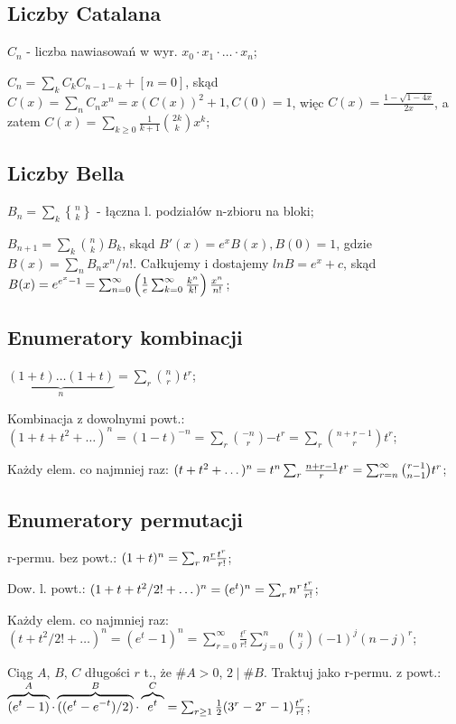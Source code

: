 \subsection{Liczby Catalana}

$C_n$ - liczba nawiasowań w wyr. $x_0 \cdot x_1 \cdot \dots \cdot x_n$;

$C_n = \sum_kC_kC_{n-1-k} + [n=0]$,
  skąd $C(x) = \sum_n C_nx^n = x(C(x))^2 + 1, C(0) = 1$,
  więc $C(x) = \frac{1 - \sqrt{1-4x}}{2x}$, a zatem $C(x) =
  \sum_{k\geq 0} \frac{1}{k+1}\binom{2k}{k}x^k$;

\subsection{Liczby Bella}

${B_n = \sum_k{n \brace k}}$ - łączna l. podziałów n-zbioru na bloki;

${B_{n+1} = \sum_k \binom{n}{k} B_k}$, skąd $B'(x) = e^xB(x), B(0) = 1$,
  gdzie $B(x) = \sum_n B_nx^n/n!$. Całkujemy i dostajemy $ln B = e^x + c$,
  skąd $B(x) = e^{e^x-1} =
  \sum_{n=0}^\infty \left ( {1 \over e} \sum_{k=0}^\infty {k^n \over k!}\right)
  {x^n \over n!}$;

\subsection{Enumeratory kombinacji}

$\underbrace{(1+t)\dots(1+t)}_n = \sum_r\binom{n}{r}t^r$;

Kombinacja z dowolnymi powt.: $(1+t+t^2+\dots)^n=(1-t)^{-n}=
  \sum_r\binom{-n}{r}{-t}^r=\sum_r\binom{n+r-1}{r}t^r$;

Każdy elem. co najmniej raz: $(t+t^2+\dots)^n = t^n\sum_r {n+r-1 \over r}t^r =
  \sum^\infty_{r=n}\binom{r-1}{n-1}t^r$;

\subsection{Enumeratory permutacji}

r-permu. bez powt.: $(1+t)^n = \sum_rn^{\underline{r}}{t^r \over r!}$;

Dow. l. powt.: ${(1+t+t^2/2! + \dots)^n} = {(e^{t})^n} =
  {\sum_rn^r{t^r \over r!}}$;

Każdy elem. co najmniej raz: $(t + t^2/2! + \dots)^n = (e^t - 1)^n =
  \sum^\infty_{r=0}\frac{t^r}{r!}\sum^n_{j=0}\binom{n}{j}(-1)^j(n-j)^r$;

Ciąg $A$, $B$, $C$ długości $r$ t., że $\#A>0$, $2\mid\#B$. Traktuj jako r-permu.
  z powt.:
  $\overbrace{(e^t - 1)}^A\cdot\overbrace{((e^t - e^{-t})/2)}^B
  \cdot\overbrace{e^t}^C =
  \sum_{r \geq 1} {1 \over 2}(3^r - 2^r - 1){t^r \over r!}$;
